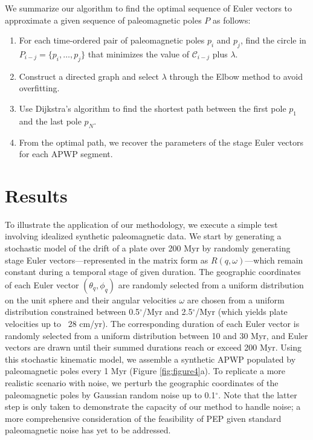 \documentclass{article} %
\begin{document}
We summarize our algorithm to find the optimal sequence of Euler vectors to approximate a given sequence of paleomagnetic poles $P$ as follows:

\begin{enumerate}
    \item For each time-ordered  pair of paleomagnetic poles $p_i$ and $p_j$, find the circle in $P_{i-j} = \{ p_i, \ldots, p_{j} \}$ that minimizes the value of $\mathcal C_{i-j}$ plus $\lambda$.
    \item Construct a directed graph and select $\lambda$ through the Elbow method to avoid overfitting.
    \item Use Dijkstra's algorithm to find the shortest path between the first pole $p_1$ and the last pole $p_N$. 
    \item From the optimal path, we recover the parameters of the stage Euler vectors for each APWP segment.
\end{enumerate}

\section{Results}

To illustrate the application of our methodology, we execute a simple test involving idealized synthetic paleomagnetic data.  We start by generating a stochastic model of the drift of a plate over 200 Myr by randomly generating stage Euler vectors---represented in the matrix form as $R(q,\omega)$---which remain constant during a temporal stage of given duration. The geographic coordinates of each Euler vector $(\theta_{q}, \phi_{q})$ are randomly selected from a uniform distribution on the unit sphere and their angular velocities $\omega$ are chosen from a uniform distribution constrained between 0.5$^{\circ}$/Myr and 2.5$^{\circ}$/Myr (which yields plate velocities up to ~28 cm/yr). The corresponding duration of each Euler vector is randomly selected from a uniform distribution between 10 and 30 Myr, and Euler vectors are drawn until their summed durations reach or exceed 200 Myr. Using this stochastic kinematic model, we assemble a synthetic APWP populated by paleomagnetic poles every 1 Myr (Figure \ref{fig:figure4}a). To replicate a more realistic scenario with noise, we perturb the geographic coordinates of the paleomagnetic poles by Gaussian random noise up to 0.1$^{\circ}$. Note that the latter step is only taken to demonstrate the capacity of our method to handle noise; a more comprehensive consideration of the feasibility of PEP given standard paleomagnetic noise has yet to be addressed.
\end{document}
